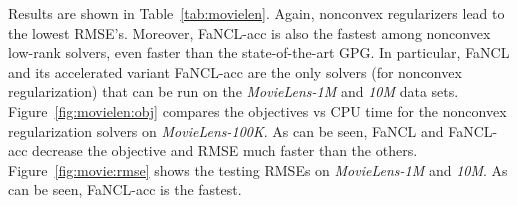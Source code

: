 \documentclass[10pt,journal,compsoc]{IEEEtran}
\begin{document}
Results are shown in Table~\ref{tab:movielen}. 
Again, nonconvex regularizers lead to the lowest RMSE's. 
Moreover, \textsf{FaNCL-acc}
is also the fastest among nonconvex low-rank solvers,
even faster than the state-of-the-art 
\textsf{GPG}.
In particular, 
\textsf{FaNCL} and its accelerated variant \textsf{FaNCL-acc}
are the only solvers (for nonconvex regularization) 
that can be run on the
\textit{MovieLens-1M} and \textit{10M} data sets.
Figure~\ref{fig:movielen:obj} compares the objectives vs CPU time 
for the nonconvex regularization solvers
on \textit{MovieLens-100K}.
As can be seen,
\textsf{FaNCL} and \textsf{FaNCL-acc} decrease the objective and RMSE much faster than the others.
Figure~\ref{fig:movie:rmse} 
shows the testing RMSEs on \textit{MovieLens-1M} and \textit{10M}.
As can be seen, \textsf{FaNCL-acc} is the fastest.
\end{document}
